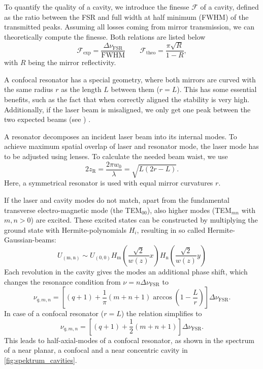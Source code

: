 To quantify the quality of a cavity, we introduce the finesse $\mathcal{F}$ of a cavity, defined as the ratio between the FSR and full width at half minimum (FWHM) of the transmitted peaks. Assuming all losses coming from mirror transmission, we can theoretically compute the finesse. Both relations are listed below
\begin{equation}\label{eqn:finesse}
	\mathcal{F}_{\text{exp}} = \frac{\Delta \nu_{\mathrm{FSR}}}{\text{FWHM}} \qquad \mathcal{F}_{\text{theo}} = \frac{\pi\sqrt{R}}{1 - R},
\end{equation}
with $R$ being the mirror reflectivity.

A confocal resonator has a special geometry, where both mirrors are curved with the same radius $r$ as the length $L$ between them ($r = L$). This has some essential benefits, such as the fact that when correctly aligned the stability is very high. Additionally, if the laser beam is misaligned, we only get one peak between the two expected beams (see \autocite{WikiOticalCavit}) . 

A resonator decomposes an incident laser beam into its internal modes. To achieve maximum spatial overlap of laser and resonator mode, the laser mode has to be adjusted using lenses. To calculate the needed beam waist, we use
\begin{equation}\label{eqn:w0}
	2z_\mathrm{R} = \frac{2\pi w_0}{\lambda} = \sqrt{L(2r-L)}.
\end{equation}
Here, a symmetrical resonator is used with equal mirror curvatures $r$. 

If the laser and cavity modes do not match, apart from the fundamental transverse electro-magnetic mode (the TEM$_{00}$), also higher modes (TEM$_{mn}$ with $m, n > 0$) are excited. These excited states can be constructed by multiplying the ground state with Hermite-polynomials $H_i$, resulting in so called Hermite-Gaussian-beams:
\begin{equation}
	U_{\mathrm{(m,n)}} \sim {U_{(0,0)}H_{\mathrm{m}}\left(\frac{\sqrt{2}}{w(z) }x\right) H_{\mathrm{n}}\left(\frac{\sqrt{2}}{w(z)}y\right)}\label{hermite-gaussian-beams}
\end{equation}
Each revolution in the cavity gives the modes an additional phase shift, which changes the resonance condition from $\nu = n\Delta \nu_{\mathrm{FSR}}$ to
\begin{equation}\label{eqn:cos}
	\nu_{q,m,n} = \left[ (q+1)+\frac{1}{\pi} (m + n + 1)\arccos{\left(1-\frac{L}{r}\right)} \right]\Delta \nu_{\mathrm{FSR}}. 
\end{equation}
In case of a confocal resonator ($r = L$) the relation simplifies to
\begin{equation}
	\nu_{q,m,n} = \left[ (q+1)+\frac{1}{2}(m+n+1) \right]\Delta \nu_{\mathrm{FSR}}. 
\end{equation}
This  leads to half-axial-modes of a confocal resonator, as shown in the spectrum of a near planar, a confocal and a near concentric cavity in \autoref{fig:spektrum_cavities}. 


